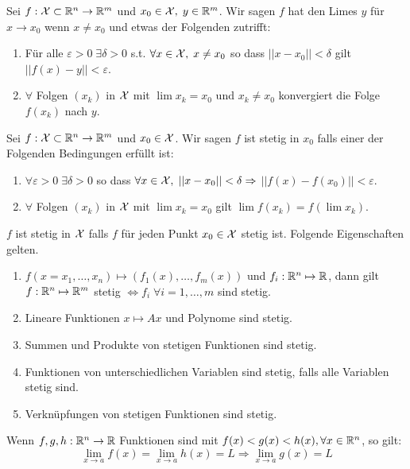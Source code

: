 Sei $f: \mathcal{X} \subset \mathbb{R}^n \to \mathbb{R}^m$ und $x_0 \in \mathcal{X}, \; y \in \mathbb{R}^m$. Wir sagen $f$ hat den Limes $y$ 
für $x \to x_0$ wenn $x \neq x_0$ und etwas der Folgenden zutrifft:

\begin{enumerate}[label=(\arabic*)]
  \item Für alle $ \varepsilon > 0 \; \exists \delta > 0$ s.t. $\forall x \in \mathcal{X},\; x \neq x_0$ so dass
  $||x - x_0|| < \delta$ gilt $||f(x) - y|| < \varepsilon$.
  \item $\forall$ Folgen $(x_k)$ in $\mathcal{X}$ mit $\lim x_k = x_0$ und $x_k \neq x_0$ konvergiert die Folge $f(x_k)$ nach $y$.
\end{enumerate}



Sei $f: \mathcal{X} \subset \mathbb{R}^n \to \mathbb{R}^m$ und $x_0 \in \mathcal{X}$. Wir sagen $f$ ist stetig in $x_0$ falls einer der Folgenden
Bedingungen erfüllt ist:

\begin{enumerate}[label=(\arabic*)]
  \item $\forall \varepsilon > 0 \; \exists \delta > 0$ so dass $\forall x \in \mathcal{X}, \; ||x - x_0|| < \delta \Rightarrow$ 
  $||f(x) - f(x_0)|| < \varepsilon$.
  \item $\forall$ Folgen $(x_k)$ in $\mathcal{X}$ mit $\lim x_k = x_0$ gilt $\lim f(x_k) = f (\lim x_k)$.
\end{enumerate}

$f$ ist stetig in $\mathcal{X}$ falls $f$ für jeden Punkt $x_0 \in \mathcal{X}$ stetig ist. Folgende Eigenschaften gelten.

\begin{enumerate}[label=(\arabic*)]
  \item $f(x = x_1, \dots, x_n) \mapsto (f_1(x), \dots, f_m(x))$ und $f_i: \mathbb{R}^n \mapsto \mathbb{R}$,  
  dann gilt $f: \mathbb{R}^n \mapsto \mathbb{R}^m$ stetig $\Leftrightarrow f_i \; \forall i = 1, \dots, m$ sind 
  stetig.
  \item Lineare Funktionen $x \mapsto Ax$ und Polynome sind stetig.
  \item Summen und Produkte von stetigen Funktionen sind stetig.
  \item Funktionen von unterschiedlichen Variablen sind stetig, falls alle Variablen stetig sind.
  \item Verknüpfungen von stetigen Funktionen sind stetig.
\end{enumerate}



Wenn $f, g, h: \mathbb{R}^n \to \mathbb{R}$ Funktionen sind mit $f(x) < g(x) < h(x), \forall x \in \mathbb{R}^n$, so gilt:
$$\lim_{x \to a} f(x) = \lim_{x \to a} h(x) = L \Rightarrow \lim_{x \to a} g(x) = L$$


